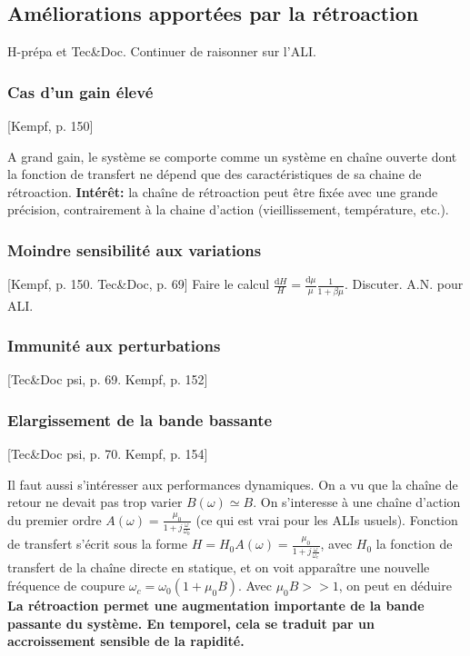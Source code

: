 \documentclass[11pt]{report}
\numberwithin{figure}{section}
\numberwithin{equation}{section}
\numberwithin{table}{section}
\newcommand{\ud}{\mathrm{d}}
\newcommand{\1}{\boldsymbol{1}}
\begin{document}
\subsection{Améliorations apportées par la rétroaction}

H-prépa et Tec\&Doc. Continuer de raisonner sur l'ALI.

\subsubsection{Cas d'un gain élevé}

[Kempf, p. 150]

A grand gain, le système se comporte comme un système en chaîne ouverte dont la fonction de transfert ne dépend que des caractéristiques de sa chaine de rétroaction.  \textbf{Intérêt:} la chaîne de rétroaction peut être fixée avec une grande précision, contrairement à la chaine d'action (vieillissement, température, etc.).


\subsubsection{Moindre sensibilité aux variations}

[Kempf, p. 150. Tec\&Doc, p. 69] Faire le calcul $\frac{\ud H}{H} = \frac{\ud \mu}{\mu} \frac{1}{1+\beta \mu}$. Discuter. A.N. pour ALI.

\subsubsection{Immunité aux perturbations}

[Tec\&Doc psi, p. 69. Kempf, p. 152]

\subsubsection{Elargissement de la bande bassante}

[Tec\&Doc psi, p. 70. Kempf, p. 154]

Il faut aussi s'intéresser aux performances dynamiques. On a vu que la chaîne de retour ne devait pas trop varier $B(\omega) \simeq B$. On s'interesse à une chaîne d'action du premier ordre $A(\omega) = \frac{\mu_0}{1+j \frac{\omega}{\omega_0}}$ (ce qui est vrai pour les ALIs usuels). Fonction de transfert s'écrit sous la forme $H = H_0 A(\omega) = \frac{\mu_0}{1+j \frac{\omega}{\omega_c}}$, avec $H_0$ la fonction de transfert de la chaîne directe en statique, et on voit apparaître une nouvelle fréquence de coupure $\omega_c = \omega_0 (1+\mu_0 B)$. Avec $\mu_0 B >> 1$, on peut en déduire \textbf{La rétroaction permet une augmentation importante de la bande passante du système. En temporel, cela se traduit par un accroissement sensible de la rapidité.}
\end{document}

